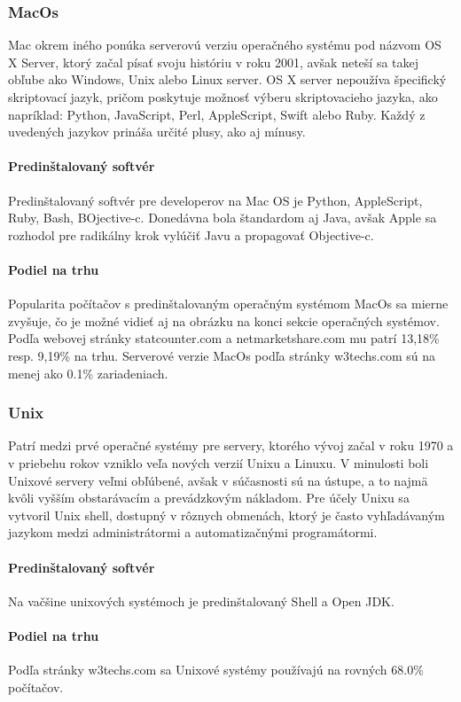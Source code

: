 \subsubsection{MacOs}
\indent  Mac okrem iného ponúka serverovú verziu operačného systému pod názvom OS X Server, ktorý začal písať svoju históriu v roku 2001, avšak neteší sa takej obľube ako Windows, Unix alebo Linux server. OS X server nepoužíva  špecifický skriptovací jazyk, pričom poskytuje možnosť výberu skriptovacieho jazyka, ako napríklad: Python, JavaScript, Perl, AppleScript, Swift alebo Ruby. Každý z uvedených jazykov prináša určité plusy, ako aj mínusy.
\paragraph{Predinštalovaný softvér}
\indent Predinštalovaný softvér pre developerov na Mac OS je Python, AppleScript, Ruby, Bash, BOjective-c. Donedávna bola štandardom aj Java, avšak Apple sa rozhodol pre radikálny krok vylúčiť Javu a propagovať Objective-c.
\paragraph{Podiel na trhu}
\indent Popularita počítačov s predinštalovaným operačným systémom MacOs sa mierne zvyšuje, čo je možné vidieť aj na obrázku na konci sekcie operačných systémov. Podľa webovej stránky statcounter.com\cite{statcounter} a netmarketshare.com\cite{netmarketshare} mu patrí 13,18\% resp.  9,19\% na trhu.
\indent Serverové verzie MacOs podľa stránky w3techs.com\cite{pop} sú na menej ako 0.1\% zariadeniach.
\subsubsection{Unix}
\indent Patrí medzi prvé operačné systémy pre servery, ktorého vývoj začal v roku 1970 a v priebehu rokov vzniklo veľa nových verzií Unixu a Linuxu. V minulosti boli Unixové servery veľmi obľúbené, avšak v súčasnosti sú na ústupe, a to najmä kvôli vyšším obstarávacím a prevádzkovým nákladom. Pre účely Unixu sa vytvoril Unix shell, dostupný v rôznych obmenách, ktorý je často vyhľadávaným jazykom medzi administrátormi a automatizačnými programátormi.
\paragraph{Predinštalovaný softvér}
\indent Na vačšine unixových systémoch je predinštalovaný Shell a Open JDK.
\paragraph{Podiel na trhu}
\indent Podľa stránky w3techs.com\cite{pop} sa Unixové systémy používajú na rovných 68.0\% počítačov.
